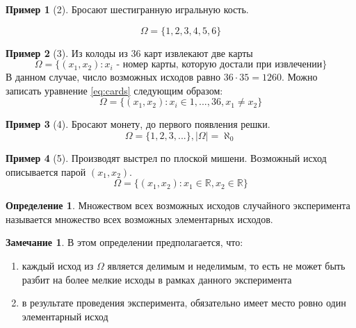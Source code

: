 \documentclass[a4paper, 14pt]{report}
\theoremstyle{definition}
\newtheorem*{definition}{Определение}
\newtheorem*{note}{Замечание}
\newtheorem*{example}{Пример}
\begin{document}
			\begin{example}[2]
				Бросают шестигранную игральную кость.
				
				\begin{equation}
					\Omega=\{1, 2, 3, 4, 5, 6\}
				\end{equation}
			\end{example}
				
			\begin{example}[3]
				Из колоды из 36 карт извлекают две карты
				\begin{equation}
					\label{eq:cards}
					\Omega=\{(x_1, x_2): x_i\text{ - номер карты, которую достали при извлечении}\}
				\end{equation}
				В данном случае, число возможных исходов равно $36\cdot 35=1260$. Можно записать уравнение \ref{eq:cards} следующим образом:
				\begin{equation}
					\Omega=\{(x_1, x_2): x_i\in {1,...,36}, x_1\ne x_2\}
				\end{equation}
			\end{example}
				
			\begin{example}[4]
				Бросают монету, до первого появления решки. 
				\begin{equation}
					\Omega=\{1,2,3,...\}, |\Omega|=\aleph_0
				\end{equation}
			\end{example}
				
			\begin{example}[5]
				Производят выстрел по плоской мишени. Возможный исход описывается парой $(x_1,x_2)$.
				\begin{equation}
					\Omega=\{(x_1, x_2): x_1\in\mathbb{R},x_2\in\mathbb{R}\}
				\end{equation}
			\end{example}
		
			\begin{definition}
				Множеством всех возможных исходов случайного эксперимента называется множество всех возможных элементарных исходов.
			\end{definition}
			
			\begin{note}
				В этом определении предполагается, что:
				\begin{enumerate}
					\item каждый исход из $\Omega$ является делимым и неделимым, то есть не может быть разбит на более мелкие исходы в рамках данного эксперимента
					\item в результате проведения эксперимента, обязательно имеет место ровно один элементарный исход
				\end{enumerate}
			\end{note}
		
\end{document}
